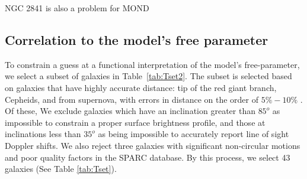 \documentclass[reprint,%
 amsmath,amssymb,
 aps,
]{revtex4-1}
\begin{document}
NGC 2841 is also a problem for MOND
\subsection{Correlation to  the model's free parameter }

To constrain a guess at a functional interpretation of the model's free-parameter, we select a
  subset of galaxies in Table~\ref{tab:Tset2}. The  subset is selected based on
   galaxies that have highly accurate distance:   tip of the red giant branch,  Cepheids, and  from supernova, with errors in distance on the order of $5\% - 10\%$ \cite{2016Lelli}. Of these, We   exclude galaxies  which have an inclination greater than $85^o$ as impossible to constrain a proper surface brightness profile, and those at inclinations less than $35^o$ as being impossible to accurately report line of sight Doppler shifts.  We also reject  three galaxies with significant non-circular motions and poor quality factors in the SPARC database.  
  By this process, we select 43 galaxies (See Table \ref{tab:Tset}). 
  
\end{document}
